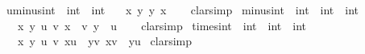 \begin{isabellebody}
\ uminus{\isacharunderscore}{\kern0pt}int\ {\isacharcolon}{\kern0pt}{\isacharcolon}{\kern0pt}\ {\isachardoublequoteopen}int\ {\isasymRightarrow}\ int{\isachardoublequoteclose}\isanewline
\ \ \ {\isachardoublequoteopen}{\isasymlambda}{\isacharparenleft}{\kern0pt}x{\isacharcomma}{\kern0pt}\ y{\isacharparenright}{\kern0pt}{\isachardot}{\kern0pt}\ {\isacharparenleft}{\kern0pt}y{\isacharcomma}{\kern0pt}\ x{\isacharparenright}{\kern0pt}{\isachardoublequoteclose}\isanewline
%
\isadelimproof
\ \ %
\endisadelimproof
%
\isatagproof
{}\isamarkupfalse%
\ clarsimp%
\endisatagproof
{\isafoldproof}%
%
\isadelimproof
\isanewline
%
\endisadelimproof
\isanewline
{}\isamarkupfalse%
\ minus{\isacharunderscore}{\kern0pt}int\ {\isacharcolon}{\kern0pt}{\isacharcolon}{\kern0pt}\ {\isachardoublequoteopen}int\ {\isasymRightarrow}\ int\ {\isasymRightarrow}\ int{\isachardoublequoteclose}\isanewline
\ \ \ {\isachardoublequoteopen}{\isasymlambda}{\isacharparenleft}{\kern0pt}x{\isacharcomma}{\kern0pt}\ y{\isacharparenright}{\kern0pt}\ {\isacharparenleft}{\kern0pt}u{\isacharcomma}{\kern0pt}\ v{\isacharparenright}{\kern0pt}{\isachardot}{\kern0pt}\ {\isacharparenleft}{\kern0pt}x\ {\isacharplus}{\kern0pt}\ v{\isacharcomma}{\kern0pt}\ y\ {\isacharplus}{\kern0pt}\ u{\isacharparenright}{\kern0pt}{\isachardoublequoteclose}\isanewline
%
\isadelimproof
\ \ %
\endisadelimproof
%
\isatagproof
{}\isamarkupfalse%
\ clarsimp%
\endisatagproof
{\isafoldproof}%
%
\isadelimproof
\isanewline
%
\endisadelimproof
\isanewline
{}\isamarkupfalse%
\ times{\isacharunderscore}{\kern0pt}int\ {\isacharcolon}{\kern0pt}{\isacharcolon}{\kern0pt}\ {\isachardoublequoteopen}int\ {\isasymRightarrow}\ int\ {\isasymRightarrow}\ int{\isachardoublequoteclose}\isanewline
\ \ \ {\isachardoublequoteopen}{\isasymlambda}{\isacharparenleft}{\kern0pt}x{\isacharcomma}{\kern0pt}\ y{\isacharparenright}{\kern0pt}\ {\isacharparenleft}{\kern0pt}u{\isacharcomma}{\kern0pt}\ v{\isacharparenright}{\kern0pt}{\isachardot}{\kern0pt}\ {\isacharparenleft}{\kern0pt}x{\isacharasterisk}{\kern0pt}u\ {\isacharplus}{\kern0pt}\ y{\isacharasterisk}{\kern0pt}v{\isacharcomma}{\kern0pt}\ x{\isacharasterisk}{\kern0pt}v\ {\isacharplus}{\kern0pt}\ y{\isacharasterisk}{\kern0pt}u{\isacharparenright}{\kern0pt}{\isachardoublequoteclose}\isanewline
%
\isadelimproof
%
\endisadelimproof
%
\isatagproof
{}\isamarkupfalse%
\ {\isacharparenleft}{\kern0pt}clarsimp{\isacharparenright}{\kern0pt}\isanewline

\end{isabellebody}
